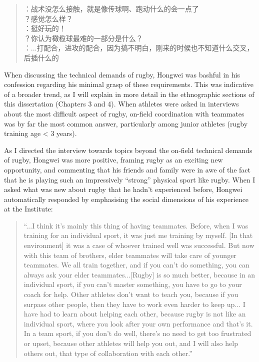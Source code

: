 \begin{CJK}{UTF8}{gbsn}
  \begin{quotation}
    ：战术没怎么接触，就是像传球啊、跑动什么的会一点了 \\
    ？感觉怎么样？\\
    ：挺好玩的！\\
    ？你认为橄榄球最难的一部分是什么？ \\
    ：...打配合，进攻的配合，因为搞不明白，刚来的时候也不知道什么交叉，后插什么的 \\
  \end{quotation}
\end{CJK}

When discussing the technical demands of rugby, Hongwei was bashful in his confession regarding his minimal grasp of these requirements. This was indicative of a broader trend, as I will explain in more detail in the ethnographic sections of this dissertation (Chapters 3 and 4). When athletes were asked in interviews about the most difficult aspect of rugby, on-field coordination with teammates was by far the most common answer, particularly among junior athletes (rugby training age < 3 years).

As I directed the interview towards topics beyond the on-field technical demands of rugby, Hongwei was more positive, framing rugby as an exciting new opportunity, and commenting that his friends and family were in awe of the fact that he is playing such an impressively ``strong'' physical sport like rugby. When I asked what was new about rugby that he hadn't experienced before, Hongwei automatically responded by emphasising the social dimensions of his experience at the Institute:

\begin{quotation}
  ``...I think it's mainly this thing of having teammates. Before, when I was training for an individual sport, it was just me training by myself. [In that environment] it was a case of whoever trained well was successful.  But now with this team of brothers, elder teammates will take care of younger teammates. We all train together, and if you can’t do something, you can always ask your elder teammates...[Rugby] is so much better, because in an individual sport, if you can't master something, you have to go to your coach for help. Other athletes don't want to teach you, because if you surpass other people, then they have to work even harder to keep up... I have had to learn about helping each other, because rugby is not like an individual sport, where you look after your own performance and that's it.  In a team sport, if you don't do well, there's no need to get too frustrated or upset, because other athletes will help you out, and I will also help others out, that type of collaboration with each other.''
\end{quotation}


